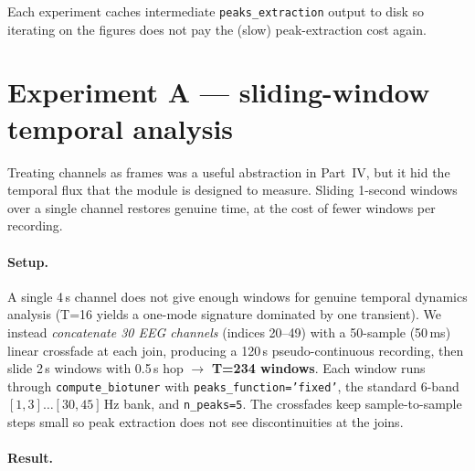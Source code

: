 \documentclass[11pt,a4paper]{article}
\begin{document}
Each experiment caches intermediate \texttt{peaks\_extraction} output to
disk so iterating on the figures does not pay the (slow)
peak-extraction cost again.

\section{Experiment A --- sliding-window temporal analysis}

\begin{insight}
Treating channels as frames was a useful abstraction in Part~IV, but it
hid the temporal flux that the module is designed to measure. Sliding
1-second windows over a single channel restores genuine time, at the
cost of fewer windows per recording.
\end{insight}

\paragraph{Setup.}  A single 4\,s channel does not give enough windows
for genuine temporal dynamics analysis (T=16 yields a one-mode signature
dominated by one transient). We instead \emph{concatenate 30 EEG
channels} (indices 20--49) with a 50-sample (50\,ms) linear crossfade
at each join, producing a 120\,s pseudo-continuous recording, then
slide 2\,s windows with 0.5\,s hop $\to$ \textbf{T=234 windows}. Each
window runs through \texttt{compute\_biotuner} with
\texttt{peaks\_function='fixed'}, the standard 6-band
$[1,3]\dots[30,45]$\,Hz bank, and \texttt{n\_peaks=5}. The crossfades
keep sample-to-sample steps small so peak extraction does not see
discontinuities at the joins.

\paragraph{Result.}
\end{document}
